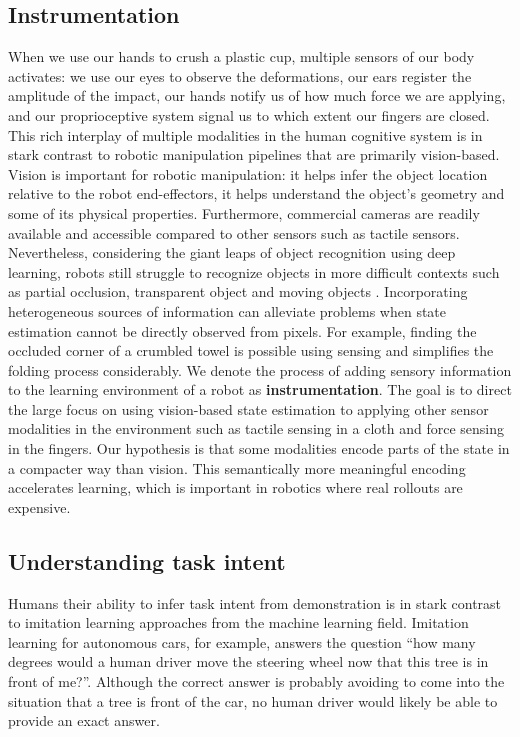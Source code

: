 \documentclass[\home/main.tex]{subfiles}
\begin{document}
\subsection{Instrumentation}
When we use our hands to crush a plastic cup, multiple sensors of our body activates: we use our eyes to observe the deformations, our ears register the amplitude of the impact, our hands notify us of how much force we are applying, and our proprioceptive system signal us to which extent our fingers are closed. This rich interplay of multiple modalities in the human cognitive system is in stark contrast to robotic manipulation pipelines that are primarily vision-based. Vision is important for robotic manipulation: it helps infer the object location relative to the robot end-effectors, it helps understand the object's geometry and some of its physical properties. Furthermore, commercial cameras are readily available and accessible compared to other sensors such as tactile sensors. Nevertheless, considering the giant leaps of object recognition using deep learning, robots still struggle to recognize objects in more difficult contexts such as partial occlusion, transparent object and moving objects \autocite{Guo2014,sajjan2019cleargrasp,Ojha2015}.
Incorporating heterogeneous sources of information can alleviate problems when state estimation cannot be directly observed from pixels. For example, finding the occluded corner of a crumbled towel is possible using sensing and simplifies the folding process considerably.
We denote the process of adding sensory information to the learning environment of a robot as \textbf{instrumentation}. The goal is to direct the large focus on using vision-based state estimation to applying other sensor modalities in the environment such as tactile sensing in a cloth and force sensing in the fingers. Our hypothesis is that some modalities encode parts of the state in a compacter way than vision. This semantically more meaningful encoding accelerates learning, which is important in robotics where real rollouts are expensive.

\subsection{Understanding task intent}
Humans their ability to infer task intent from demonstration is in stark contrast to imitation learning approaches from the machine learning field. Imitation learning for autonomous cars, for example, answers the question \enquote{how many degrees would a human driver move the steering wheel now that this tree is in front of me?}. Although the correct answer is probably avoiding to come into the situation that a tree is front of the car, no human driver would likely be able to provide an exact answer.
\end{document}
